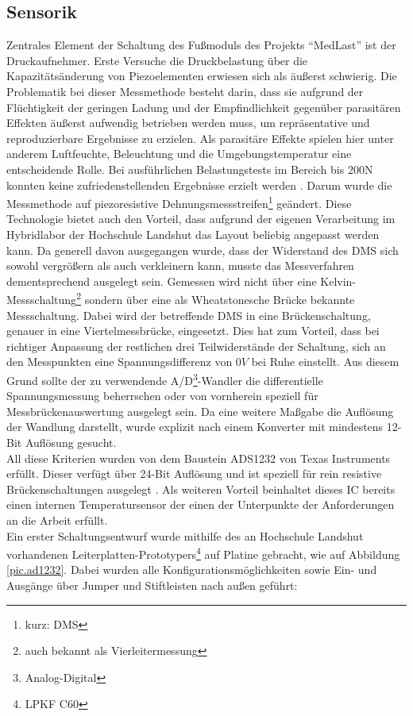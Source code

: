 \documentclass[12pt]{scrreprt} %
\begin{document}
\subsection{Sensorik}
\label{Sensorik}
Zentrales Element der Schaltung des Fußmoduls des Projekts "`MedLast"' ist der Druckaufnehmer. Erste Versuche die Druckbelastung über die Kapazitätsänderung von Piezoelementen erwiesen sich als äußerst schwierig. Die Problematik bei dieser Messmethode besteht darin, dass sie aufgrund der Flüchtigkeit der geringen Ladung und der Empfindlichkeit gegenüber parasitären Effekten äußerst aufwendig betrieben werden muss, um repräsentative und reproduzierbare Ergebnisse zu erzielen. Als parasitäre Effekte spielen hier unter anderem Luftfeuchte, Beleuchtung und die Umgebungstemperatur eine entscheidende Rolle. Bei ausführlichen Belastungstests im Bereich bis 200N konnten keine zufriedenstellenden Ergebnisse erzielt werden \citep{Jobstmann2012}. Darum wurde die Messmethode auf piezoresistive Dehnungsmessstreifen\footnote{kurz: DMS} geändert. Diese Technologie bietet auch den Vorteil, dass aufgrund der eigenen Verarbeitung im Hybridlabor der Hochschule Landshut das Layout beliebig angepasst werden kann. Da generell davon ausgegangen wurde, dass der Widerstand des DMS sich sowohl vergrößern als auch verkleinern kann, musste das Messverfahren dementsprechend ausgelegt sein. Gemessen wird nicht über eine Kelvin-Messschaltung\footnote{auch bekannt als Vierleitermessung} sondern über eine als Wheatstonesche Brücke bekannte Messschaltung. Dabei wird der betreffende DMS in eine Brückenschaltung, genauer in eine Viertelmessbrücke, eingesetzt. Dies hat zum Vorteil, dass bei richtiger Anpassung der restlichen drei Teilwiderstände der Schaltung, sich an den Messpunkten eine Spannungsdifferenz von $0V$ bei Ruhe einstellt. Aus diesem Grund sollte der zu verwendende A/D\footnote{Analog-Digital}-Wandler die differentielle Spannungsmessung beherrschen oder von vornherein speziell für Messbrückenauswertung ausgelegt sein. Da eine weitere Maßgabe die Auflösung der Wandlung darstellt, wurde explizit nach einem Konverter mit mindestens 12-Bit Auflösung gesucht.\\
All diese Kriterien wurden von dem Baustein ADS1232 von Texas Instruments erfüllt. Dieser verfügt über 24-Bit Auflösung und ist speziell für rein resistive Brückenschaltungen ausgelegt \citep{ADS1232}. Als weiteren Vorteil beinhaltet dieses IC bereits einen internen Temperatursensor der einen der Unterpunkte der Anforderungen an die Arbeit erfüllt.\\
Ein erster Schaltungsentwurf wurde mithilfe des an Hochschule Landshut vorhandenen Leiterplatten-Prototypers\footnote{LPKF C60} auf Platine gebracht, wie auf Abbildung \vref{pic.ad1232}. Dabei wurden alle Konfigurationsmöglichkeiten sowie Ein- und Ausgänge über Jumper und Stiftleisten nach außen geführt:
\end{document}
